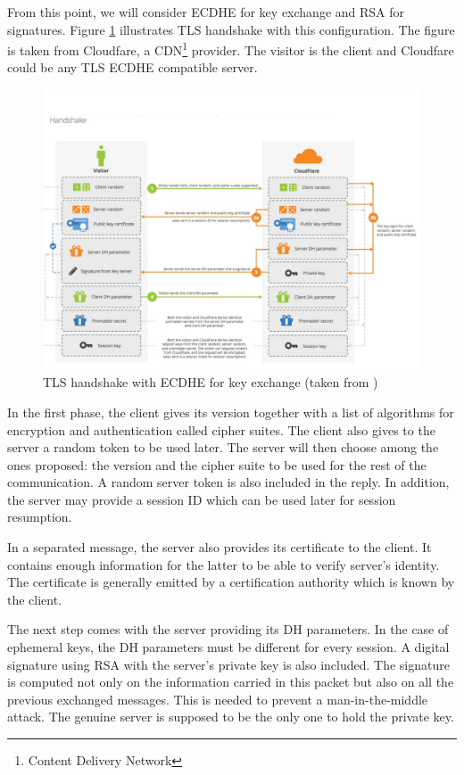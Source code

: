 From this point, we will consider ECDHE for key exchange and RSA for signatures. Figure \ref{fig:tls_handshake} illustrates TLS handshake with this configuration. The figure is taken from Cloudfare, a CDN\footnote{Content Delivery Network} provider. The visitor is the client and Cloudfare could be any TLS ECDHE compatible server. 

\begin{figure}[!h]
\centering
\includegraphics[width=\linewidth]{images/ECDHEhandshake}
\caption{TLS handshake with ECDHE for key exchange (taken from \cite{tlsdhhandshake})}
\label{fig:tls_handshake}
\end{figure}

In the first phase, the client gives its version together with a list of algorithms for encryption and authentication called cipher suites. The client also gives to the server a random token to be used later. The server will then choose among the ones proposed: the version and the cipher suite to be used for the rest of the communication. A random server token is also included in the reply. In addition, the server may provide a session ID which can be used later for session resumption.

In a separated message, the server also provides its certificate to the client. It contains enough information for the latter to be able to verify server's identity. The certificate is generally emitted by a certification authority which is known by the client.

The next step comes with the server providing its DH parameters. In the case of ephemeral keys, the DH parameters must be different for every session. A digital signature using RSA with the server's private key is also included. The signature is computed not only on the information carried in this packet but also on all the previous exchanged messages. This is needed to prevent a man-in-the-middle attack. The genuine server is supposed to be the only one to hold the private key.

